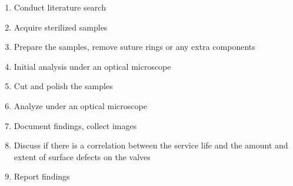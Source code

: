 \begin{enumerate}
    \item Conduct literature search
    \item Acquire sterilized samples
    \item Prepare the samples, remove suture rings or any extra components
    \item Initial analysis under an optical microscope
    \item Cut and polish the samples
    \item Analyze under an optical microscope
    \item Document findings, collect images
    \item Discuss if there is a correlation between the service life and the amount and extent of surface defects on the valves
    \item Report findings
\end{enumerate}
